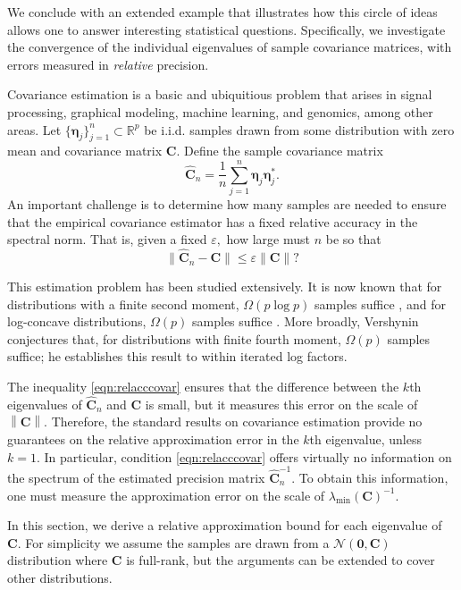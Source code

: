 \documentclass[11pt,letterpaper,twoside,reqno,nosumlimits]{amsart}
\renewcommand{\star}{*}
\newcommand{\mat}[1]{\ensuremath{\bm{#1}}} %
\renewcommand{\vec}[1]{\ensuremath{\bm{#1}}}
\newcommand{\R}{\ensuremath{\mathbb{R}}}
\newcommand{\norm}[1]{\ensuremath{\left\|#1\right\|}}
\newcommand{\snorm}[1]{\ensuremath{\|#1\|}}
\newcommand{\lambdamin}[1]{\ensuremath{\lambda_{\mathrm{min}}\left(#1\right)}}
\theoremstyle{remark}
\numberwithin{equation}{section}
\numberwithin{thm}{section}
\numberwithin{prop}{section}
\numberwithin{defn}{section}
\numberwithin{remark}{section}
\begin{document}
We conclude with an extended example that illustrates how this circle of ideas allows one to answer interesting statistical questions. Specifically, we investigate the convergence of the individual eigenvalues of sample covariance matrices, with errors measured in \emph{relative} precision.

Covariance estimation is a basic and ubiquitious problem that arises in signal processing, graphical modeling, machine learning, and genomics, among other areas. Let $\{\vec{\eta}_j\}_{j=1}^n \subset \R^p$ be i.i.d. samples drawn from some distribution with zero mean and covariance matrix $\mat{C}.$ Define the sample covariance matrix 
\[
 \widehat{\mat{C}}_n = \frac{1}{n} \sum_{j=1}^n \vec{\eta}_j\vec{\eta}_j^\star.
\]
An important challenge is to determine how many samples are needed to ensure that the empirical covariance estimator has a fixed relative accuracy in the spectral norm. That is, given a fixed $\varepsilon,$ how large must $n$ be so that 
\begin{equation}
\label{eqn:relacccovar}
 \snorm{\widehat{\mat{C}}_n - \mat{C}} \leq \varepsilon \snorm{\mat{C}}?
\end{equation}

This estimation problem has been studied extensively. It is now known that for distributions with a finite second moment, $\Omega(p \log p)$ samples suffice \cite{RU99}, and for log-concave distributions, $\Omega(p)$ samples suffice \cite{ALPT10b}. More broadly, Vershynin \cite{V10} conjectures that, for distributions with finite fourth moment, $\Omega(p)$ samples suffice; he establishes this result to within iterated log factors.

The inequality \eqref{eqn:relacccovar} ensures that the difference between the $k$th eigenvalues of $\widehat{\mat{C}}_n$ and $\mat{C}$ is small, but it measures this error on the scale of $\norm{\mat{C}}$. Therefore, the standard results on covariance estimation provide no guarantees on the relative approximation error in the $k$th eigenvalue, unless $k=1.$ In particular, condition \eqref{eqn:relacccovar} offers virtually no information on the spectrum of the estimated precision matrix $\widehat{\mat{C}}_n^{-1}.$ To obtain this information, one must measure the approximation error on the scale of $\lambdamin{\mat{C}}^{-1}.$ 

In this section, we derive a relative approximation bound for each eigenvalue of $\mat{C}.$ For simplicity we assume the samples are drawn from a $\mathcal{N}(\vec{0}, \mat{C})$ distribution where $\mat{C}$ is full-rank, but the arguments can be extended to cover other distributions.
\end{document}
